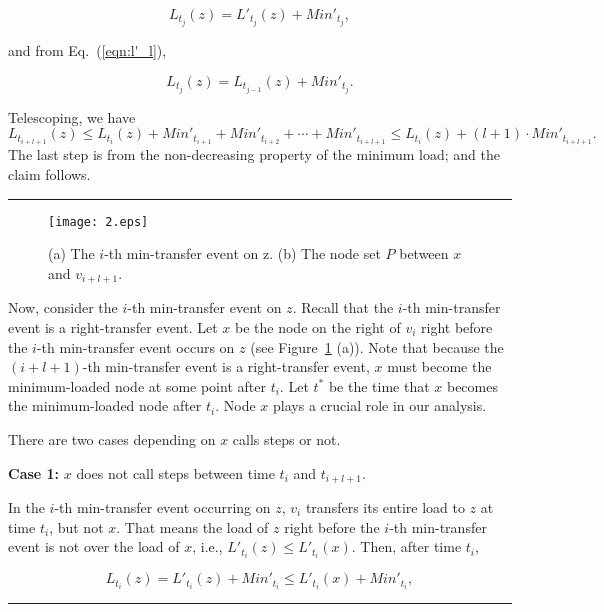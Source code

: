 \documentclass[a4paper]{article}
\newenvironment{proof}{{\bf Proof:}}{\hfill\rule{1.5mm}{3mm}\vspace{0.1in}}
\begin{document}
\begin{proof}
\begin{proof}
  \begin{equation} \label{eqn:def_load_after_mintransfer}
    L_{t_j}(z)=L'_{t_j}(z)+Min'_{t_j},
  \end{equation}  

  and from Eq.~(\ref{eqn:l'_l}),

  \begin{equation} \label{eqn:tele}
    L_{t_j}(z)=L_{t_{j-1}}(z)+Min'_{t_j}.
  \end{equation}

  Telescoping, we have
  \[
  L_{t_{i+l+1}}(z) \leq L_{t_{i}}(z) +Min'_{t_{i+1}}+Min'_{t_{i+2}}+
  \cdots+ Min'_{t_{i+l+1}} \leq L_{t_{i}}(z) + (l+1)\cdot
  Min'_{t_{i+l+1}}.
  \]
  The last step is from the non-decreasing property of the minimum
  load; and the claim follows.
\end{proof}


\begin{figure}
    \centering \texttt{[image: 2.eps]}
    \caption{(a) The $i$-th min-transfer event on z. (b) The node set
      $P$ between $x$ and $v_{i+l+1}$.}
    \label{fig:2}
  \end{figure}

  Now, consider the $i$-th min-transfer event on $z$. Recall that the 
  $i$-th min-transfer event is a right-transfer event.  Let $x$ be the node on
  the right of $v_i$ right before the $i$-th min-transfer event occurs
  on $z$ (see Figure~\ref{fig:2} (a)).  Note that because the
  $(i+l+1)$-th min-transfer event is a right-transfer event, $x$
  must become the minimum-loaded node at some point after $t_i$. Let $t^*$ be the
  time that $x$ becomes the minimum-loaded node  after $t_i$.
  Node $x$ plays a crucial role in our analysis.
  
  There are two cases depending on $x$ calls {\minbalance} steps or not.
  
  \textbf{Case 1:} $x$ does not call {\minbalance} steps between time
  $t_i$ and $t_{i+l+1}$.
  
  In the $i$-th min-transfer event occurring on $z$, $v_i$ transfers
  its entire load to $z$ at time $t_i$, but not $x$. That means the
  load of $z$ right before the $i$-th min-transfer event is not over
  the load of $x$, i.e., $L'_{t_i}(z)\leq L'_{t_i}(x)$. Then, after
  time $t_i$,

  \begin{equation}\label{eqn:1.5}
    L_{t_i}(z) = L'_{t_i}(z)+Min'_{t_i}\leq L'_{t_i}(x)+Min'_{t_i},
  \end{equation}


\end{proof}
\end{document}
